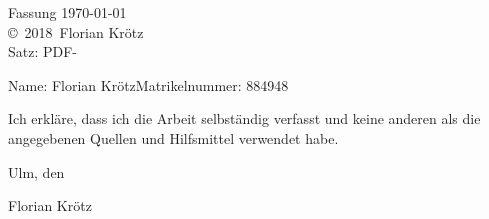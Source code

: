 \documentclass[a4paper,12pt,
headsepline,        %
oneside,            %
bibtotoc,           %
pointlessnumbers,   %
BCOR15mm             %
]{scrbook}
\newcommand{\fullname}{Florian Krötz}
\newcommand{\jahr}{2018}
\newcommand{\matnr}{884948}
\begin{document}
\clearpage
\thispagestyle{empty}
{ \small
  \flushleft
  Fassung \today \\\vfill
  \copyright~\jahr~\fullname\\[0.5em]
  Satz: PDF-\LaTeXe
}



\setcounter{tocdepth}{2}
\tableofcontents


\mainmatter






\appendix
%


\backmatter

%



\clearpage
\thispagestyle{empty}

Name: \fullname \hfill Matrikelnummer: \matnr \vspace{2cm}


Ich erkläre, dass ich die Arbeit selbständig verfasst und keine anderen als die angegebenen Quellen und Hilfsmittel verwendet habe.\vspace{2cm}

Ulm, den \dotfill

\hspace{10cm} {\footnotesize \fullname}
\end{document}
